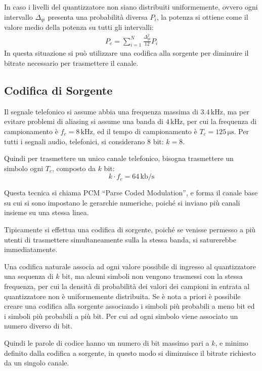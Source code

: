 \documentclass{article}
\numberwithin{equation}{subsection}
\begin{document}
In caso i livelli del quantizzatore non siano distribuiti uniformemente, ovvero ogni intervallo $\Delta_{qi}$ presenta una probabilità diversa $P_i$, la potenza si ottiene 
come il valore medio della potenza su tutti gli intervalli:
\begin{gather*}
    P_e=\displaystyle\sum_{i=1}^N\frac{\Delta_{qi}^2}{12}P_i
\end{gather*}
In questa situazione si può utilizzare una codifica alla sorgente per diminuire il bitrate necessario per trasmettere il canale. 

\subsection{Codifica di Sorgente}

Il segnale telefonico si assume abbia una frequenza massima di $3.4\,\mathrm{kHz}$, ma per evitare problemi di aliasing si assume una banda di $4\,\mathrm{kHz}$, 
per cui la frequenza di campionamento è $f_c=8\,\mathrm{kHz}$, 
ed il tempo di campionamento è $T_c=125\,\mathrm{\mu s}$. Per tutti i segnali audio, telefonici, si considerano $8$ bit: $k=8$. 

Quindi per trasmettere un unico canale telefonico, bisogna trasmettere un simbolo ogni $T_c$, composto da $k$ bit:
\begin{equation}
    k\cdot f_c=64\,\mathrm{kb/s}
\end{equation}

Questa tecnica si chiama PCM ``Parse Coded Modulation'', e forma il canale base su cui si sono impostano le gerarchie numeriche, poiché si inviano più 
canali insieme su una stessa linea. 


Tipicamente si effettua una codifica di sorgente, poiché se venisse permesso a più utenti di trasmettere simultaneamente sulla la stessa banda, 
si saturerebbe immediatamente. 

Una codifica naturale associa ad ogni valore possibile di ingresso al quantizzatore una sequenza di $k$ bit, ma alcuni simboli non vengono trasmessi con la stessa frequenza, 
per cui la densità di probabilità dei valori dei campioni in entrata al quantizzatore non è uniformemente distribuita. Se è nota a priori è possibile 
creare una codifica alla sorgente associando i simboli più probabili a meno bit ed i simboli più probabili a più bit. Per cui ad ogni simbolo viene associato un numero 
diverso di bit. 

Quindi le parole di codice hanno un numero di bit massimo pari a $k$, e minimo definito dalla codifica a sorgente, in questo modo si diminuisce il bitrate richiesto da un 
singolo canale. 
\end{document}
